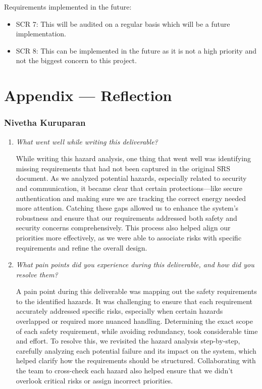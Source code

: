 \documentclass{article}
\newcounter{hazard}
\begin{document}
Requirements implemented in the future:
\begin{itemize}
    \item SCR 7: This will be audited on a regular basis which will be a future implementation.
    \item SCR 8: This can be implemented in the future as it is not a high priority and not the biggest concern to this project.
\end{itemize}

\newpage{}

\section*{Appendix --- Reflection}

\subsubsection*{Nivetha Kuruparan}

\begin{enumerate}
  \item \textit{What went well while writing this deliverable?}
  
  While writing this hazard analysis, one thing that went well was identifying missing requirements that had not been captured in the original SRS document. As we analyzed potential hazards, especially related to security and communication, it became clear that certain protections—like secure authentication and making sure we are tracking the correct energy needed more attention. Catching these gaps allowed us to enhance the system's robustness and ensure that our requirements addressed both safety and security concerns comprehensively. This process also helped align our priorities more effectively, as we were able to associate risks with specific requirements and refine the overall design.

  \item \textit{What pain points did you experience during this deliverable, and how did you resolve them?}
  
  A pain point during this deliverable was mapping out the safety requirements to the identified hazards. It was challenging to ensure that each requirement accurately addressed specific risks, especially when certain hazards overlapped or required more nuanced handling. Determining the exact scope of each safety requirement, while avoiding redundancy, took considerable time and effort. To resolve this, we revisited the hazard analysis step-by-step, carefully analyzing each potential failure and its impact on the system, which helped clarify how the requirements should be structured. Collaborating with the team to cross-check each hazard also helped ensure that we didn’t overlook critical risks or assign incorrect priorities.

\end{enumerate}
\end{document}
